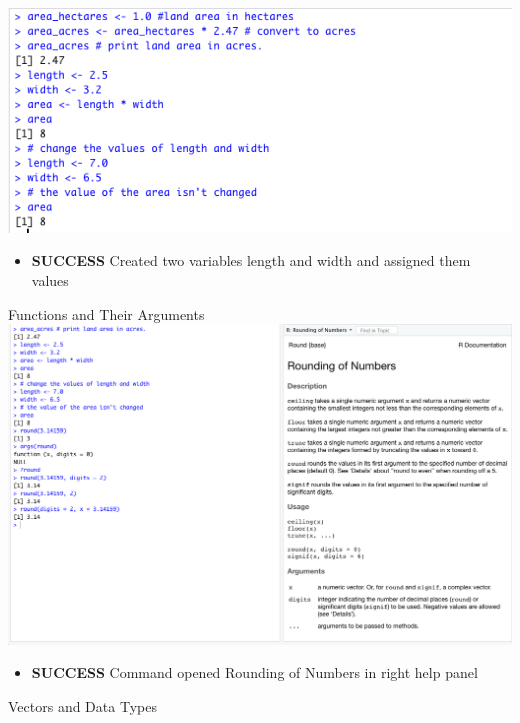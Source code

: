 \documentclass{article}
\begin{document}
\includegraphics[width=\textwidth]{Images/RStudio_4.png}
\begin{itemize}
\item \textbf{SUCCESS} Created two variables length and width and assigned them values
\end{itemize}
Functions and Their Arguments \\
\includegraphics[width=\textwidth]{Images/RStudio_5.png}
\begin{itemize}
\item \textbf{SUCCESS} Command opened Rounding of Numbers in right help panel 
\end{itemize}
Vectors and Data Types \\
\end{document}
